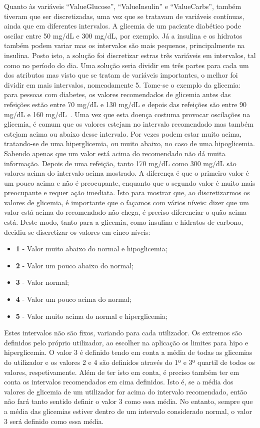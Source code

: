 Quanto às variáveis ``Value\textunderscore Glucose'', ``Value\textunderscore Insulin'' e ``Value\textunderscore Carbs'', também tiveram que ser discretizadas, uma vez que se tratavam de variáveis contínuas, ainda que em diferentes intervalos. A glicemia de um paciente diabético pode oscilar entre 50 mg/dL e 300 mg/dL, por exemplo. Já a insulina e os hidratos também podem variar mas os intervalos são mais pequenos, principalmente na insulina. 
Posto isto, a solução foi discretizar estras três variáveis em intervalos, tal como no período do dia. 
Uma solução seria dividir em três partes para cada um dos atributos mas visto que se tratam de variáveis importantes, o melhor foi dividir em mais intervalos, nomeadamente 5.
Tome-se o exemplo da glicemia: para pessoas com diabetes, os valores recomendados de glicemia antes das refeições estão entre 70 mg/dL e 130 mg/dL e depois das refeições são entre 90 mg/dL e 160 mg/dL~\cite{levels}. Uma vez que esta doença costuma provocar oscilações na glicemia, é comum que os valores estejam no intervalo recomendado mas também estejam acima ou abaixo desse intervalo. Por vezes podem estar muito acima, tratando-se de uma hiperglicemia, ou muito abaixo, no caso de uma hipoglicemia. Sabendo apenas que um valor está acima do recomendado não dá muita informação. Depois de uma refeição, tanto 170 mg/dL como 300 mg/dL são valores acima do intervalo acima mostrado. A diferença é que o primeiro valor é um pouco acima e não é preocupante, enquanto que o segundo valor é muito mais preocupante e requer ação imediata. Isto para mostrar que, ao discretizarmos os valores de glicemia, é importante que o façamos com vários níveis: dizer que um valor está acima do recomendado não chega, é preciso diferenciar o quão acima está. Deste modo, tanto para a glicemia, como insulina e hidratos de carbono, decidiu-se discretizar os valores em cinco níveis:

\begin{itemize}
\item \textbf{1} - Valor muito abaixo do normal e hipoglicemia;
\item \textbf{2} - Valor um pouco abaixo do normal;
\item \textbf{3} - Valor normal;
\item \textbf{4} - Valor um pouco acima do normal;
\item \textbf{5} - Valor muito acima do normal e hiperglicemia;
\end{itemize}
Estes intervalos não são fixos, variando para cada utilizador. Os extremos são definidos pelo próprio utilizador, ao escolher na aplicação os limites para hipo e hiperglicemia. O valor 3 é definido tendo em conta a média de todas as glicemias do utilizador e os valores 2 e 4 são definidos através do 1º e 3º quartil de todos os valores, respetivamente. Além de ter isto em conta, é preciso também ter em conta os intervalos recomendados em cima definidos. Isto é, se a média dos valores de glicemia de um utilizador for acima do intervalo recomendado, então não fará tanto sentido definir o valor 3 como essa média. No entanto, sempre que a média das glicemias estiver dentro de um intervalo considerado normal, o valor 3 será definido como essa média.

